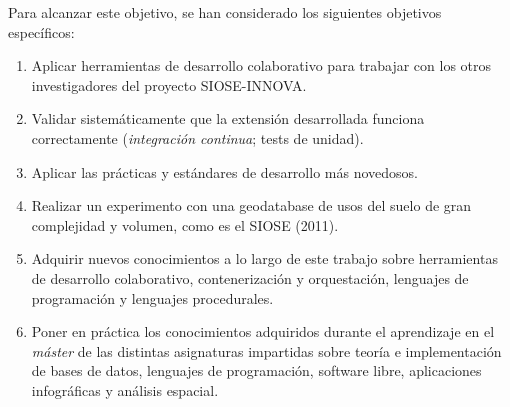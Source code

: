 Para alcanzar este objetivo, se han considerado los siguientes objetivos específicos:
\begin{enumerate}
\item Aplicar herramientas de desarrollo colaborativo para trabajar con los otros investigadores del proyecto SIOSE-INNOVA.
\item Validar sistemáticamente que la extensión desarrollada funciona correctamente (\textit{integración continua}; tests de unidad).
\item Aplicar las prácticas y estándares de desarrollo más novedosos.
\item Realizar un experimento con una geodatabase de usos del suelo de gran complejidad y volumen, como es el SIOSE (2011).
\item Adquirir nuevos conocimientos a lo largo de este trabajo sobre herramientas de desarrollo colaborativo, contenerización y orquestación, lenguajes de programación y lenguajes procedurales.
\item Poner en práctica los conocimientos adquiridos durante el aprendizaje en el \textit{máster} de las distintas asignaturas impartidas sobre teoría e implementación de bases de datos, lenguajes de programación, software libre, aplicaciones infográficas y análisis espacial.
\end{enumerate}





